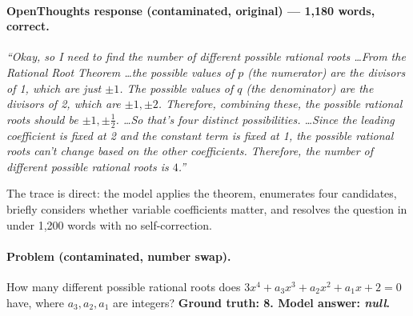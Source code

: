 \documentclass{article} %
\begin{document}
\paragraph{OpenThoughts response (contaminated, original) --- 1,180 words, correct.}
\begin{mdframed}
\textit{``Okay, so I need to find the number of different possible rational roots \ldots From the Rational Root Theorem \ldots the possible values of $p$ (the numerator) are the divisors of 1, which are just $\pm1$. The possible values of $q$ (the denominator) are the divisors of 2, which are $\pm1, \pm2$. Therefore, combining these, the possible rational roots should be $\pm1, \pm\frac{1}{2}$. \ldots So that's four distinct possibilities. \ldots Since the leading coefficient is fixed at 2 and the constant term is fixed at 1, the possible rational roots can't change based on the other coefficients. Therefore, the number of different possible rational roots is $\boxed{4}$.''}
\end{mdframed}
The trace is direct: the model applies the theorem, enumerates four candidates, briefly considers whether variable coefficients matter, and resolves the question in under 1,200 words with no self-correction.

\paragraph{Problem (contaminated, number swap).}
\begin{mdframed}
How many different possible rational roots does $3x^4 + a_3x^3 + a_2x^2 + a_1x + 2 = 0$ have, where $a_3, a_2, a_1$ are integers?
\quad \textbf{Ground truth: 8. Model answer: \textit{null}.}
\end{mdframed}
\end{document}
